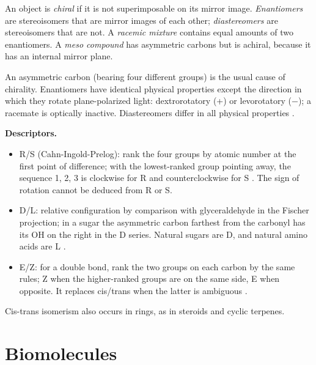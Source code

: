 \begin{definition}
\label{definition-chem-chirality}
An object is \emph{chiral} if it is not
superimposable on its mirror image.
\emph{Enantiomers} are stereoisomers that are
mirror images of each other;
\emph{diastereomers} are stereoisomers that
are not. A \emph{racemic mixture} contains
equal amounts of two enantiomers. A
\emph{meso compound} has asymmetric carbons
but is achiral, because it has an internal
mirror plane.
\end{definition}

An asymmetric carbon (bearing four different
groups) is the usual cause of chirality.
Enantiomers have identical physical
properties except the direction in which they
rotate plane-polarized light: dextrorotatory
(+) or levorotatory ($-$); a racemate is
optically inactive. Diastereomers differ in
all physical properties \cite[Chapter
5]{wade2013organic}.

\textbf{Descriptors.}
\begin{itemize}
\item R/S (Cahn-Ingold-Prelog): rank the four
groups by atomic number at the first point of
difference; with the lowest-ranked group
pointing away, the sequence 1, 2, 3 is
clockwise for R and counterclockwise for S
\cite[Section 5-3]{wade2013organic}. The sign
of rotation cannot be deduced from R or S.
\item D/L: relative configuration by
comparison with glyceraldehyde in the Fischer
projection; in a sugar the asymmetric carbon
farthest from the carbonyl has its OH on the
right in the D series. Natural sugars are D,
and natural amino acids are L \cite[Sections
5-10 and 23-3]{wade2013organic}.
\item E/Z: for a double bond, rank the two
groups on each carbon by the same rules; Z
when the higher-ranked groups are on the same
side, E when opposite. It replaces cis/trans
when the latter is ambiguous \cite[Section
7-5]{wade2013organic}.
\end{itemize}
Cis-trans isomerism also occurs in rings, as
in steroids and cyclic terpenes.

\section{Biomolecules}
\label{section-chem-biomolecules}

